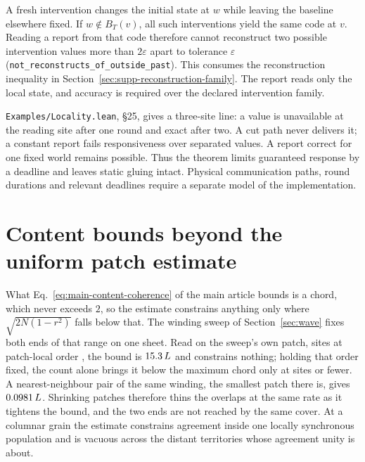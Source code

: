 \documentclass{article}
\begin{document}
A fresh intervention changes the initial state at $w$ while leaving the
baseline elsewhere fixed. If $w\notin B_T(v)$, all such interventions yield
the same code at $v$. Reading a report from that code therefore cannot
reconstruct two possible intervention values more than $2\varepsilon$ apart
to tolerance $\varepsilon$
(\nolinkurl{not_reconstructs_of_outside_past}).
This consumes the reconstruction inequality in
Section~\ref{sec:supp-reconstruction-family}. The report reads only the local
state, and accuracy is required over the declared intervention family.

\nolinkurl{Examples/Locality.lean}, \S25, gives a three-site line:
a value is unavailable at the reading site after one round and exact after
two. A cut path never delivers it; a constant report fails responsiveness over
separated values. A report correct for one fixed world remains possible.
Thus the theorem limits guaranteed response by a deadline and leaves static
gluing intact. Physical communication paths, round durations and relevant
deadlines require a separate model of the implementation.


\section{Content bounds beyond the uniform patch estimate}
\label{sec:supp-content-bounds}

What Eq.~\eqref{eq:main-content-coherence} of the main article bounds is a chord, which never exceeds $2$, so the estimate constrains anything only where $\sqrt{2N(1-r^2)}$ falls below that. The winding sweep of Section~\ref{sec:wave} fixes both ends of that range on one sheet. Read on the sweep's own patch, \wavePatchSites{} sites at patch-local order \waveBandLocalOrder, the bound is $15.3\,L$ and constrains nothing; holding that order fixed, the count alone brings it below the maximum chord only at \wavePatchInformativeSites{} sites or fewer. A nearest-neighbour pair of the same winding, the smallest patch there is, gives $0.0981\,L$. Shrinking patches therefore thins the overlaps at the same rate as it tightens the bound, and the two ends are not reached by the same cover. At a columnar grain the estimate constrains agreement inside one locally synchronous population and is vacuous across the distant territories whose agreement unity is about.
\end{document}

